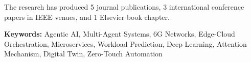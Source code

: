 The research has produced 5 journal publications, 3 international conference papers in \ac{IEEE} venues, and 1 Elsevier book chapter.

\vspace{1em}
\noindent\textbf{Keywords:} Agentic AI, Multi-Agent Systems, 6G Networks, Edge-Cloud Orchestration, Microservices, Workload Prediction, Deep Learning, Attention Mechanism, Digital Twin, Zero-Touch Automation
